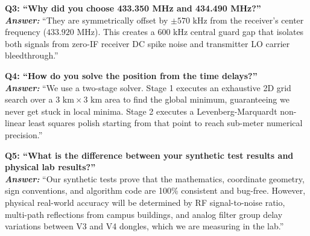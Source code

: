 \documentclass[11pt,a4paper]{article}
\begin{document}
\vspace{0.2cm}
\noindent\textbf{Q3: ``Why did you choose 433.350 MHz and 434.490 MHz?''}\\
\textit{\textbf{Answer:}} ``They are symmetrically offset by $\pm 570\text{ kHz}$ from the receiver's center frequency ($433.920\text{ MHz}$). This creates a $600\text{ kHz}$ central guard gap that isolates both signals from zero-IF receiver DC spike noise and transmitter LO carrier bleedthrough.''

\vspace{0.2cm}
\noindent\textbf{Q4: ``How do you solve the position from the time delays?''}\\
\textit{\textbf{Answer:}} ``We use a two-stage solver. Stage 1 executes an exhaustive 2D grid search over a $3\text{ km} \times 3\text{ km}$ area to find the global minimum, guaranteeing we never get stuck in local minima. Stage 2 executes a Levenberg-Marquardt non-linear least squares polish starting from that point to reach sub-meter numerical precision.''

\vspace{0.2cm}
\noindent\textbf{Q5: ``What is the difference between your synthetic test results and physical lab results?''}\\
\textit{\textbf{Answer:}} ``Our synthetic tests prove that the mathematics, coordinate geometry, sign conventions, and algorithm code are 100\% consistent and bug-free. However, physical real-world accuracy will be determined by RF signal-to-noise ratio, multi-path reflections from campus buildings, and analog filter group delay variations between V3 and V4 dongles, which we are measuring in the lab.''
\end{document}
